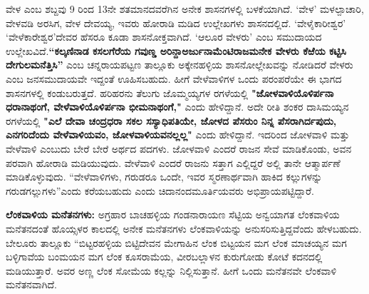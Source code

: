 ವೇಳ ಎಂಬ ಶಬ್ದವು 9 ರಿಂದ 13ನೇ ಶತಮಾನದವರೆಗಿನ ಅನೇಕ ಶಾಸನಗಳಲ್ಲಿ ಬಳಕೆಯಾಗಿದೆ. ‘ವೇಳ’ ಮಳಲ್ಪಾಚಾರಿ, ವೇಳವಡಿ ಅರಸಿಗ, ವೇಳ ದೇವಯ್ಯ, ಇವರು ಹೋರಾಡಿ ಮಡಿದ ಉಲ್ಲೇಖಗಳು ಶಾಸನದಲ್ಲಿದೆ. ‘ವೇಳೈಕಾರೀಶ್ವರ’ ‘ವೇಳೆಕಾರೇಶ್ವರ’ದೇವರ ಹೆಸರೂ ಕೂಡಾ ಶಾಸನೋಕ್ತವಾಗಿದೆ. ‘ಆಲೂರ ವೇಳರು’ ಎಂಬ ಸಮುದಾಯದ ಉಲ್ಲೇಖವಿದೆ.\textbf{“ಕಲ್ಕಣಿನಾಡ ಕಸಲಗೆರೆಯ ಗವುಣ್ಡ ಅರಿನ್ದಾಅರ್ಜುನಾಮೆಂಟಿರಾಜಮನೇಕ ವೇಳರು ಕೆಱೆಯ ಕಟ್ಟಿಸಿ ದೇಗುಲಮನೆತ್ತಿಸಿ”} ಎಂಬ ಚನ್ನರಾಯಪಟ್ಟಣ ತಾಲ್ಲೂಕು ಅಕ್ಕೇನಹಳ್ಳಿಯ ಶಾಸನೋಲ್ಲೇಖವನ್ನು ನೋಡಿದರೆ ವೇಳರು ಎಂಬ ಜನಸಮುದಾಯವೇ ಇದ್ದಂತೆ ಊಹಿಸಬಹುದು. ಹೀಗೆ ವೇಳೆವಾಳಿಗಳ ಒಂದು ಪರಂಪರೆಯೇ ಈ ಭಾಗದ ಶಾಸನಗಳಲ್ಲಿ ಕಂಡುಬರುತ್ತದೆ. ಹರಿಹರನು ತೆಲುಗು ಜೊಮ್ಮಯ್ಯಗಳ ರಗಳೆಯಲ್ಲಿ \textbf{"ಜೋಳವಾಳಿಯೊಳಿರ್ಪನಾ ಧರಾನಾಥಂಗೆ, ವೇಳೆವಾಳಿಯೊಳಿರ್ಪನಾ ಭೀಮನಾಥಂಗೆ,"} ಎಂದು ಹೇಳಿದ್ದಾನೆ. ಅದೇ ರೀತಿ ಶಂಕರ ದಾಸಿಮಯ್ಯನ ರಗಳೆಯಲ್ಲಿ \textbf{"ಎಲೆ ದೇವಾ ಚಂದ್ರಧರಾ ಸಕಲ ಸಸ್ಯಾಧಿಪತಿಯೇ, ಜೋಳದ ಪೆಸರುಂ ನಿನ್ನ ಪೆಸರಾಗಿರ್ದಪುದು, ಎನಗರಿದೆಂದು ವೇಳೆವಾಳಿಯವಂ, ಜೋಳವಾಳಿಯವನಲ್ಲಲ್ಲ"} ಎಂದು ಹೇಳಿದ್ದಾನೆ. ಇದರಿಂದ ಜೋಳವಾಳಿ ಮತ್ತು ವೇಳೆವಾಳಿ ಎಂಬುದು ಬೇರೆ ಬೇರೆ ಅರ್ಥದ ಪದಗಳು. ಜೋಳವಾಳಿ ಎಂದರೆ ರಾಜನ ಸೇವೆ ಮಾಡಿಕೊಂಡು, ಅವನ ಪರವಾಗಿ ಹೋರಾಡಿ ಮಡಿಯುವುದು. ವೇಳೆವಾಳಿ ಎಂದರೆ ರಾಜನು ಸತ್ತಾಗ ಎಲ್ಲಿದ್ದರೆ ಅಲ್ಲಿ ತಾನೇ ಆತ್ಮಾರ್ಪಣೆ ಮಾಡಿಕೊಳ್ಳುವುದು. “ವೇಳೆವಾಳಿಗಳು, ಗರುಡರೂ ಒಂದೇ, ಇವರ ಸ್ಮರಣಾರ್ಥವಾಗಿ ಹಾಕಿದ ಕಲ್ಲುಗಳನ್ನು ಗರುಡಗಲ್ಲುಗಳು”ಎಂದು ಕರೆಯಬಹುದು ಎಂದು ಚಿದಾನಂದಮೂರ್ತಿಯವರು ಅಭಿಪ್ರಾಯಪಟ್ಟಿದ್ದಾರೆ.

\newpage

\textbf{ಲೆಂಕವಾಳಿಯ ಮನೆತನಗಳು:} ಅಗ್ರಹಾರ ಬಾಚಹಳ್ಳಿಯ ಗಂಡನಾರಾಯಣ ಸೆಟ್ಟಿಯ ಅನ್ವಯಾಗತ ಲೆಂಕವಾಳಿಯ ಮನೆತನದಂತೆ ಹೊಯ್ಸಳರ ಕಾಲದಲ್ಲಿ ಅನೇಕ ಮನೆತನಗಳು ಲೆಂಕವಾಳಿಯನ್ನು ಅನುಸರಿಸುತ್ತಿದ್ದವೆಂದು ಹೇಳಬಹುದು. ಬೇಲೂರು ತಾಲ್ಲೂಕು “ಬಿಟ್ಟರಹಳ್ಳಿಯ ಬಿಟ್ಟಿದೇವನ ಮೇಗಾಹಿನ ಲೆಂಕ ಬಿಟ್ಟಯನ ಮಗ ಲೆಂಕ ಮಾಚಯ್ಯನ ಮಗ ಬಳ್ಳಿಗಾವೆಯ ಬಂಮಯನ ಮಗ ಲೆಂಕ ಕೂಸರಾಮೆಯ, ವೀರಬಲ್ಲಾಳನ ಕುರುಗೋಡು ಕೋಟೆ ಕದನದಲ್ಲಿ ಮಡಿಯುತ್ತಾರೆ. ಅವರ ಅಣ್ಣ ಲೆಂಕ ಸೋಮೆಯ ಕಲ್ಲನ್ನು ನಿಲ್ಲಿಸುತ್ತಾನೆ. ಹೀಗೆ ಒಂದು ಮನೆತನವೇ ಲೆಂಕವಾಳಿ ಮನೆತನವಾಗಿದೆ.

